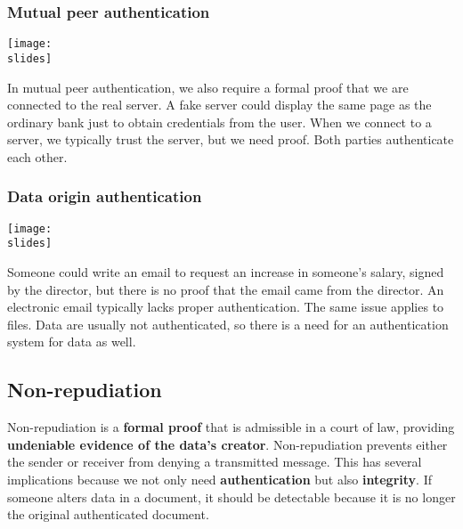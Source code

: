\subsubsection*{Mutual peer authentication}
\noindent
\begin{minipage}{0.5\textwidth}
  \centering
  \texttt{[image: \\slides]}
\end{minipage}
\hspace{0.05\textwidth}
\begin{minipage}{0.4\textwidth}
  In mutual peer authentication, we also require a formal proof that we are connected to the real server. A fake server could display the same page as the ordinary bank just to obtain credentials from the user. When we connect to a server, we typically trust the server, but we need proof. Both parties authenticate each other.
\end{minipage}

\subsubsection*{Data origin authentication}
\noindent
\begin{minipage}{0.5\textwidth}
  \centering
  \texttt{[image: \\slides]}
\end{minipage}
\hspace{0.05\textwidth}
\begin{minipage}{0.4\textwidth}
  Someone could write an email to request an increase in someone's salary, signed by the director, but there is no proof that the email came from the director. An electronic email typically lacks proper authentication. The same issue applies to files. Data are usually not authenticated, so there is a need for an authentication system for data as well.
\end{minipage}

\subsection{Non-repudiation}
Non-repudiation is a \textbf{formal proof} that is admissible in a court of law, providing \textbf{undeniable evidence of the data's creator}. Non-repudiation prevents either the sender or receiver from denying a transmitted message. This has several implications because we not only need \textbf{authentication} but also \textbf{integrity}. If someone alters data in a document, it should be detectable because it is no longer the original authenticated document.

